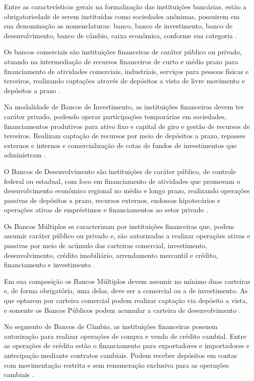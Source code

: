 \documentclass[12pt,12pt,openright,oneside,a4paper,chapter=TITLE,section=TITLE,subsection=TITLE,subsubsection=TITLE,english,french,spanish,portugues,sumario=tradicional]{abntex2}
\begin{document}
Entre as características gerais na formalização das instituições bancárias, estão a obrigatoriedade de serem instituídas como sociedades anônimas, possuirem em sua denominação as nomenclaturas: banco, banco de investimento, banco de desenvolvimento, banco de câmbio, caixa econômica, conforme sua categoria \cite{Lei:4595:1964} \cite{Res:2099:1994} \cite{Res:2624:1999} \cite{Res:394:1976} \cite{Res:3426:2006} \cite{DL:759:1969}.

Os bancos comerciais são instituições financeiras de caráter público ou privado, atuando na intermediação de recursos financeiros de curto e médio prazo para financiamento de atividades comerciais, industriais, serviços para pessoas físicas e terceiros, realizando captações através de depósitos a vista de livre movimento e depósitos a prazo \cite{Res:2099:1994}.

Na modalidade de Bancos de Investimento, as instituições financeiras devem ter
caráter privado, podendo operar participações temporárias em sociedades,
financiamentos produtivos para ativo fixo e capital de giro e gestão de
recursos de terceiros. Realizam captação de recursos por meio de depósitos a
prazo, repasses externos e internos e comercialização de cotas de fundos de
investimentos que administram \cite{Res:2624:1999}.

O Bancos de Desenvolvimento são instituições de caráter público, de controle federal ou estadual, com foco em financiamento de atividades que promovam o desenvolvimento econômico regional no médio e longo prazo, realizando operações passivas de depósitos a prazo, recursos externos, endossos hipotecários e operações ativas de empréstimos e financiamentos ao setor privado \cite{Res:394:1976}.

Os Bancos Múltiplos se caracterizam por instituições financeiras que, podem
assumir caráter público ou privado e, são autorizadas a realizar operações
ativas e passivas por meio de acúmulo das carteiras comercial, investimento,
desenvolvimento, crédito imobiliário, arrendamento mercantil e crédito, financiamento e investimento \cite{Res:2099:1994}.

Em sua composição os Bancos Múltiplos devem assumir no mínimo duas carteiras e,
de forma obrigatória, uma delas, deve ser a comercial ou a de investimento. As
que optarem por carteira comercial podem realizar captação via depósito a vista, e somente os Bancos Públicos podem acumular a carteira de desenvolvimento \cite{Res:2099:1994}.

No segmento de Bancos de Câmbio, as instituições financeiras possuem autorização para realizar operações de compra e venda de crédito cambial. Entre as operações de crédito estão o financiamento para exportadores e importadores e antecipação mediante contratos cambiais. Podem receber depósitos em contas com movimentação restrita e sem remuneração exclusiva para as operações cambiais \cite{Res:3426:2006}.
\end{document}
